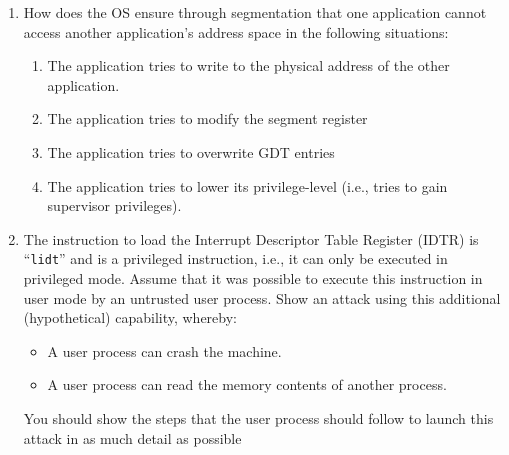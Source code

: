 \begin{enumerate}
\item How does the OS ensure through segmentation that one application cannot access another
application's address space in the following situations:
\begin{enumerate}
\item The application tries to write to the physical address of the other application.
\item The application tries to modify the segment register
\item The application tries to overwrite GDT entries
\item The application tries to lower its privilege-level (i.e., tries to gain supervisor privileges).
\end{enumerate}
\item The instruction to load the Interrupt Descriptor Table Register (IDTR)
is ``{\tt lidt}'' and is a
privileged instruction, i.e., it can only be executed in privileged mode. Assume that it was
possible to execute this instruction in user mode by an untrusted user process. Show an
attack using this additional (hypothetical) capability, whereby:
\begin{itemize}
\item A user process can crash the machine.
\item A user process can read the memory contents of another process.
\end{itemize}
You should show the steps that the user process should follow to launch this attack in as
much detail as possible
\end{enumerate}
